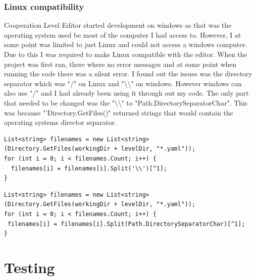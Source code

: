 \subsubsection{Linux compatibility}
Cooperation Level Editor started development on windows as that was the operating system used be most of the computer I had access to. However, I at some point was limited to just Linux and could not access a windows computer. Due to this I was required to make Linux compatible with the editor. When the project was first ran, there where no error messages and at some point when running the code there was a silent error. I found out the issues was the directory separator which was "/" on Linux and "\textbackslash\textbackslash" on windows. However windows can also use "/" and I had already been using it through out my code. The only part that needed to be changed was the "\textbackslash\textbackslash" to "Path.DirectorySeparatorChar". This was because "'Directory.GetFiles()" returned strings that would contain the operating systems director separator.

\begin{minipage}{\textwidth}
\begin{lstlisting}[language={[Sharp]C}, caption=before '\textbackslash\textbackslash' changed to'/' , label=clst:beforeDIRChange]
List<string> filenames = new List<string>(Directory.GetFiles(workingDir + levelDir, "*.yaml"));
for (int i = 0; i < filenames.Count; i++) {
  filenames[i] = filenames[i].Split('\\')[^1];
}
\end{lstlisting}
\begin{lstlisting}[language={[Sharp]C}, caption=after '\textbackslash\textbackslash' changed to '/', label=clst:afterDIRChange]
List<string> filenames = new List<string>(Directory.GetFiles(workingDir + levelDir, "*.yaml"));
for (int i = 0; i < filenames.Count; i++) {
 filenames[i] = filenames[i].Split(Path.DirectorySeparatorChar)[^1];
}
\end{lstlisting}
\end{minipage}


\section{Testing}
